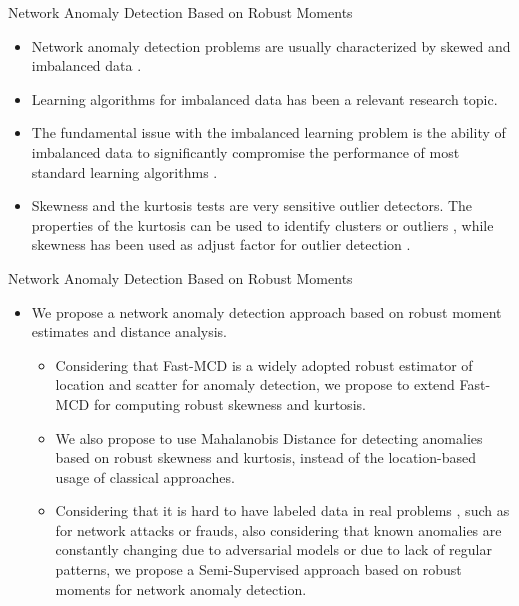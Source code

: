 \documentclass[newPxFont, numfooter, sectionpages]{beamer}
\begin{document}
\begin{frame}{Network Anomaly Detection Based on Robust Moments}
	\begin{itemize}
	    \item Network anomaly detection problems are usually characterized by skewed and imbalanced data \cite{Phua2004minority}.
	    \item Learning algorithms for imbalanced data has been a relevant research topic. 
	    \item The fundamental issue with the imbalanced learning problem is the ability of imbalanced data to significantly compromise the performance of most standard learning algorithms \cite{he2008learning}.
	    \item Skewness and the kurtosis tests are very sensitive outlier detectors. The properties of the kurtosis can be used to identify clusters or outliers \cite{pena2010eigenvectors}, while skewness has been used as adjust factor for outlier detection \cite{hubert2008outlier}.
    \end{itemize}
\end{frame}

\begin{frame}{Network Anomaly Detection Based on Robust Moments}
	\begin{itemize}
	    \item We propose a network anomaly detection approach based on robust moment estimates and distance analysis.
    	\begin{itemize}
    	    \item Considering that Fast-MCD is a widely adopted robust estimator of location and scatter for anomaly detection, we propose to extend Fast-MCD for computing robust skewness and kurtosis.
		    \item We also propose to use Mahalanobis Distance for detecting anomalies based on robust skewness and kurtosis, instead of the location-based usage of classical approaches.
		    \item Considering that it is hard to have labeled data in real problems \cite{osanaiye2016distributed}, such as for network attacks or frauds, also considering that known anomalies are constantly changing due to adversarial models or due to lack of regular patterns, we propose a Semi-Supervised approach based on robust moments for network anomaly detection.
	    \end{itemize} 
    \end{itemize}
\end{frame}
\end{document}
